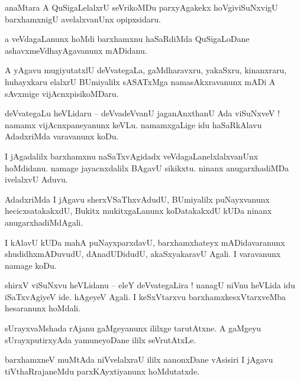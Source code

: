 \documentclass{article}
\begin{document}
\begin{mn}%
anaMtara A QuSigaLelalxrU seVrikoMDu parxyAgakekx hoVgiviSuNxvigU barxhamxnigU avelalxvanUnx 
opipxsidaru.
\end{mn}

\begin{mn}%
a veVdagaLanunx hoMdi barxhamxnu haSaRdiMda QuSigaLoDane ashavxmeVdhayAgavanunx mADidanu.
\end{mn}

\begin{mn}%
A yAgavu mugiyutatxlU deVvategaLa, gaMdharavxru, yakaSxru, kinanxraru, huhayxkaru elalxrU 
BUmiyalilx sASATxMga namasAkxravanunx mADi A sAvxmige vijAcnxpisikoMDaru.
\end{mn}

\begin{mn}%
deVvategaLu heVLidaru -- deVvadeVvanU jaganAnxthanU Ada viSuNxveV ! namamx vijAcnxpaneyanunx keVLu. 
namamxgaLige idu haSaRkAlavu AdadxriMda varavanunx koDu.
\end{mn}

\begin{mn}%
I jAgadalilx barxhamxnu naSaTxvAgidadx veVdagaLanelxlalxvanUnx hoMdidanu. namage jayacnxdalilx 
BAgavU sikikxtu. ninanx anugarxhadiMDa ivelalxvU Aduvu.
\end{mn}

\begin{mn}%
AdadxriMda I jAgavu sherxVSaThxvAdudU, BUmiyalilx puNayxvanunx hecicxsatakakxdU, Bukitx 
mukitxgaLanunx koDatakakxdU kUDa ninanx anugarxhadiMdAgali.
\end{mn}

\begin{mn}%
I kAlavU kUDa mahA puNayxparxdavU, barxhamxhateyx mADidavaranunx shudidhxmADuvudU, dAnadUDidudU, 
akaSxyakaravU Agali. I varavanunx namage koDu.
\end{mn}

\begin{mn}%
shirxV viSuNxvu heVLidanu -- eleY deVvategaLira ! nanagU niVnu heVLida idu iSaTxvAgiyeV ide. 
hAgeyeV Agali. I keSxVtarxvu barxhamxkesxVtarxveMba hesaranunx hoMdali.
\end{mn}

\begin{mn}%
sUrayxvaMshada rAjanu gaMgeyanunx ililxge tarutAtxne. A gaMgeyu sUrayxputirxyAda yamuneyoDane ililx 
seVrutAtxLe.
\end{mn}

\begin{mn}%
barxhamxneV muMtAda niVvelalxraU ililx nanonxDane vAsisiri I jAgavu tiVthaRrajaneMdu 
parxKAyxtiyanunx hoMdutatxde.
\end{mn}
\end{document}
